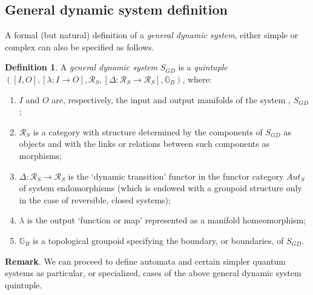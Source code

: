\documentclass[12pt]{article}
\theoremstyle{plain}
\theoremstyle{definition}
\newtheorem{definition}{Definition}[section]
\numberwithin{equation}{section}
\newcommand{\R}{\mathcal R}
\newcommand{\grp}{{\mathbb G}}
\begin{document}
\subsection{General dynamic system definition}
A formal (but natural) definition of a \emph{general dynamic system}, either simple or complex can also be specified as follows.

\begin{definition}

 A \emph{general dynamic system} $S_{GD}$ is a \emph{quintuple} 
$([I,O], [\lambda: I \to O], \R_S , [\Delta: \R_S \to \R_S], \grp_B)$, where:

\begin{enumerate}
\item $I$ and $O$ are, respectively, the input and output manifolds of the system , $S_{GD}$;
\item $\R_S$ is a category with structure determined by the components of $S_{GD}$ as objects and 
with the links or relations between such components as morphisms;
\item $\Delta: \R_S \to \R_S$ is the `dynamic transition' functor in the functor category $Aut_S$
of system endomorphisms (which is endowed with a groupoid structure only in the case of reversible, 
closed systems);
\item $\lambda$ is the output `function or map' represented as a manifold homeomorphism;
\item $\grp_B$ is a topological groupoid specifying the boundary, or boundaries, of $S_{GD}$.
\end{enumerate}

\end{definition}

\textbf{Remark}.  We can proceed to define automata and certain simpler quantum systems
as particular, or specialized, cases of the above general dynamic system quintuple. 
\end{document}
